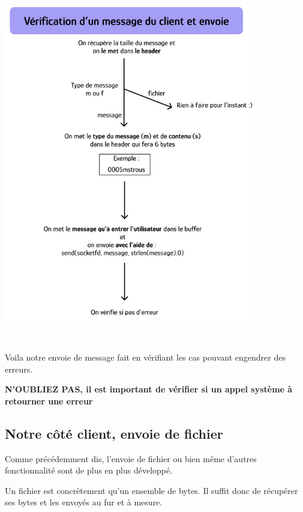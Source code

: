      {
    \centering
    \includegraphics[width=11cm]{figures/verif_msg_client_next.png}
    \par
    } \hfill \\ \par

    Voila notre envoie de message fait en vérifiant les cas pouvant engendrer des erreurs. \\ \par\textbf{N'OUBLIEZ PAS, il est important de vérifier si un appel système à retourner une erreur}

\subsection{Notre côté client, envoie de fichier}

Comme précédemment dis, l'envoie de fichier ou bien même d'autres fonctionnalité sont de plus en plus développé. \\ \par

Un fichier est concrètement qu'un ensemble de bytes. Il suffit donc de récupérer ses bytes et les envoyés au fur et à mesure. \\ \par

